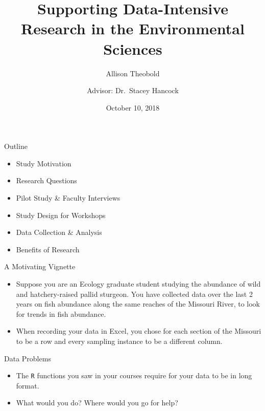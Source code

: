\documentclass[10pt,ignorenonframetext,]{beamer}
\title{Supporting Data-Intensive Research in the Environmental Sciences}
\subtitle{Allison Theobold}
\author{Advisor: Dr.~Stacey Hancock}
\date{October 10, 2018}
\providecommand{\tightlist}{%
  \setlength{\itemsep}{0pt}\setlength{\parskip}{0pt}}
\begin{document}
\frame{\titlepage}

\begin{frame}{Outline}

\begin{itemize}[<+->]
\tightlist
\item
  Study Motivation\\
\item
  Research Questions\\
\item
  Pilot Study \& Faculty Interviews\\
\item
  Study Design for Workshops\\
\item
  Data Collection \& Analysis\\
\item
  Benefits of Research
\end{itemize}

\end{frame}

\begin{frame}{A Motivating Vignette}

\begin{itemize}[<+->]
\item
  Suppose you are an Ecology graduate student studying the abundance of
  wild and hatchery-raised pallid sturgeon. You have collected data over
  the last 2 years on fish abundance along the same reaches of the
  Missouri River, to look for trends in fish abundance.
\item
  When recording your data in Excel, you chose for each section of the
  Missouri to be a row and every sampling instance to be a different
  column.
\end{itemize}

\end{frame}

\begin{frame}[fragile]{Data Problems}

\begin{multicol}{2}





\end{multicol}

\begin{itemize}[<+->]
\tightlist
\item
  The \texttt{R} functions you saw in your courses require for your data
  to be in long format.
\end{itemize}

\begin{itemize}[<+->]
\tightlist
\item
  What would you do? Where would you go for help?
\end{itemize}

\end{frame}
\end{document}

